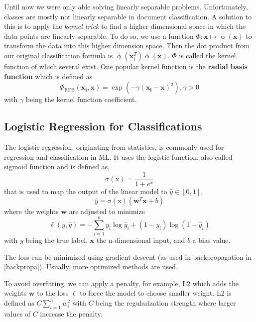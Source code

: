   Until now we were only able solving linearly separable problems.
  Unfortunately, classes are mostly not linearly separable in document classification.
  A solution to this is to apply the \emph{kernel trick} to find a higher dimensional space in which the data points are linearly separable.
  To do so, we use a function $\Phi:\mathbf{x} \mapsto \operatorname{\phi}(\mathbf{x})$ to transform the data into this higher dimension space.
  Then the dot product from our original classification formula is $\operatorname{\phi}(\mathbf{x}^{T}_{i}) \operatorname{\phi}(\mathbf{x})$.
  $\Phi$ is called the kernel function of which several exist.
  One popular kernel function is the \textbf{radial basis function} which is defined as \[\Phi_{\operatorname{RFB}}(\mathbf{x_i},\mathbf{x})= \operatorname{exp}(-\gamma (\mathbf{x_i} - \mathbf{x})^2), \gamma > 0 \]
  with $\gamma$ being the kernel function coefficient.

\subsection{Logistic Regression for Classifications}
  The logistic regression, originating from statistics, is commonly used for regression and classification in ML.
  It uses the logistic function, also called sigmoid function and is defined as, \[\operatorname{\sigma(x)} = \frac{1}{1+e^x}\]
  that is used to map the output of the linear model to $\hat{y} \in [0,1]$,
  \[\hat{y} = \operatorname{\sigma(x)}(\mathbf{w}^T\mathbf{x} +b)\]
  where the weights $\mathbf{w}$ are adjusted to minimize
  \[\operatorname{\ell}(y, \hat{y}) = - \sum_{i=1}^{n} y_i \log \hat{y}_i + (1-y_i) \log(1-\hat{y}_i)\]
  with $y$ being the true label, $\mathbf{x}$ the n-dimensional input, and $b$ a bias value.

  The loss can be minimized using gradient descent (as used in backpropagation in \ref{backpropa}). Usually, more optimized methods are used.

  To avoid overfitting, we can apply a penalty, for example, L2 which adds the weights $\mathbf{w}$ to the loss $\ell$ to force the model to choose smaller weight.
  L2 is defined as $C \sum_{i=1}^n w_i^2$ with $C$ being the regularization strength where larger values of $C$ increase the penalty.


